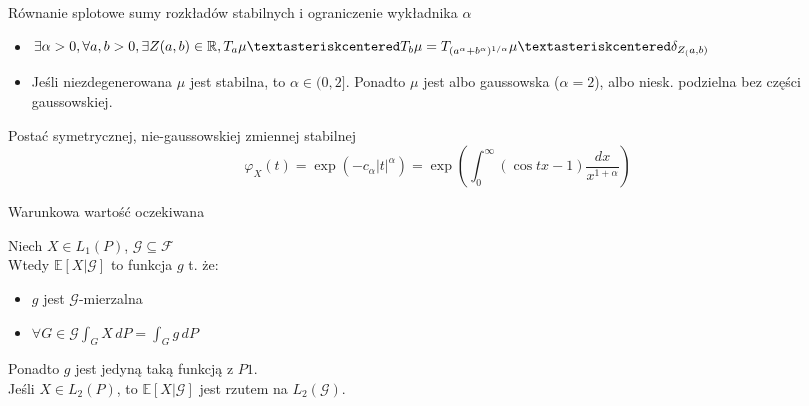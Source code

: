 \documentclass[avery5371, grid, frame]{flashcards}
\begin{document}
\begin{flashcard}[Twierdzenie]{Równanie splotowe sumy rozkładów stabilnych i ograniczenie wykładnika $\alpha$}
    \begin{itemize}
        \item $\exists \alpha > 0, \forall a, b > 0, \exists Z(a, b) \in \mathbb{R}, T_a \mu \textasteriskcentered T_b \mu = T_{(a^\alpha + b^\alpha)^{1/\alpha}} \mu \textasteriskcentered \delta_{Z_(a, b)}$
        \item Jeśli niezdegenerowana $\mu$ jest stabilna, to $\alpha \in (0, 2]$. Ponadto $\mu$ jest albo gaussowska ($\alpha = 2$), albo niesk. podzielna bez części gaussowskiej.
    \end{itemize}
\end{flashcard}

\begin{flashcard}[Twierdzenie]{Postać symetrycznej, nie-gaussowskiej zmiennej stabilnej}
$$ \varphi_X (t)= \exp (-c_\alpha |t|^\alpha) =
\exp \left( \int_0^\infty (\cos tx - 1) \frac{dx}{x^{1+\alpha}} \right)$$
\end{flashcard}


\begin{flashcard}[Definicja]{Warunkowa wartość oczekiwana}

\smallskip
Niech $ X \in L_1 (P)$, $ \mathcal{G} \subseteq  \mathcal{F}$ \\
Wtedy $\mathbb{E} [ X | \mathcal{G} ]$ to funkcja $g$ t. że:
\begin{itemize}
\item $g$ jest $\mathcal{G}$-mierzalna
\item $\forall G \in \mathcal{G} \int_G X \, dP = \int_G g \, dP$
\end{itemize}
Ponadto $g$ jest jedyną taką funkcją z $P1$. \\
Jeśli $X \in L_2(P)$, to $\mathbb{E} [ X | \mathcal{G} ]$ jest rzutem na $L_2(\mathcal{G})$.
\end{flashcard}
\end{document}
